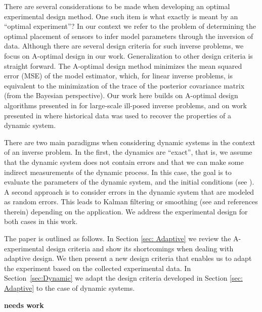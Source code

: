 \documentclass[11pt]{article}
\begin{document}
There are several considerations to be made when developing an optimal experimental design method. One such item is what exactly is meant by an ``optimal experiment''? In our context we refer to the problem of determining  the optimal placement of sensors to infer model parameters  through the inversion of  data. 
 Although there are several design criteria for such inverse problems,  we focus on A-optimal design in our work.
 Generalization to other design criteria is straight forward. 
 The A-optimal design method minimizes the mean squared error (MSE) of the model estimator, which, for linear inverse problems, is equivalent to the minimization of  the trace of the posterior covariance matrix (from the Bayesian perspective). Our work here builds on A-optimal design algorithms presented in \cite{Haber2011} for large-scale ill-posed inverse problems, and on work presented in \cite{Fohring2014} where historical data was used
 to recover the properties of a dynamic system. 

There are two main paradigms when considering dynamic systems in the context of an inverse problem. In the
first, the dynamics are ``exact'', that is, we assume that the dynamic system does not contain errors and that we can make some indirect measurements of the dynamic process. In this case,
the goal is to evaluate the parameters of the dynamic system, and the initial conditions (see \cite{Fohring2014}). 
A second approach  is
to consider errors in the dynamic system that are modeled as random errors. This leads to 
Kalman filtering or smoothing (see \cite{kalman1960,Aravkin2010} and references therein) depending on the application.
 We address the experimental design for  both cases in this work. 

\bigskip


The paper is outlined as follows. In Section \ref{sec: Adaptive} we review the A-experimental design
criteria and show its shortcomings when dealing with adaptive design.  We then present a new
design criteria that enables us to adapt the experiment based on the collected experimental data.
In Section~\ref{sec:Dynamic} we adapt the design criteria developed in Section \ref{sec: Adaptive}
to the case of dynamic systems.

{\bf needs work}
\end{document}
